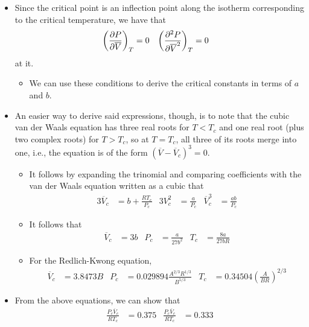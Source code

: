 \documentclass[../notes.tex]{subfiles}
\begin{document}
\begin{itemize}
\begin{itemize}
\begin{itemize}
        \end{itemize}
    \end{itemize}
    \item Since the critical point is an inflection point along the isotherm corresponding to the critical temperature, we have that
    \begin{align*}
        \left( \pdv{P}{\overline{V}} \right)_T &= 0&
        \left( \pdv[2]{P}{\overline{V}} \right)_T &= 0
    \end{align*}
    at it.
    \begin{itemize}
        \item We can use these conditions to derive the critical constants in terms of $a$ and $b$.
    \end{itemize}
    \item An easier way to derive said expressions, though, is to note that the cubic van der Waals equation has three real roots for $T<T_c$ and one real root (plus two complex roots) for $T>T_c$, so at $T=T_c$, all three of its roots merge into one, i.e., the equation is of the form $(\overline{V}-\overline{V}_c)^3=0$.
    \begin{itemize}
        \item It follows by expanding the trinomial and comparing coefficients with the van der Waals equation written as a cubic that
        \begin{align*}
            3\overline{V}_c &= b+\frac{RT_c}{P_c}&
            3V_c^2 &= \frac{a}{P_c}&
            \overline{V}_c^3 &= \frac{ab}{P_c}
        \end{align*}
        \item It follows that
        \begin{align*}
            \overline{V}_c &= 3b&
            P_c &= \frac{a}{27b^2}&
            T_c &= \frac{8a}{27bR}
        \end{align*}
        \item For the Redlich-Kwong equation,
        \begin{align*}
            \overline{V}_c &= 3.8473B&
            P_c &= 0.029894\frac{A^{2/3}R^{1/3}}{B^{5/3}}&
            T_c &= 0.34504\left( \frac{A}{BR} \right)^{2/3}
        \end{align*}
    \end{itemize}
    \item From the above equations, we can show that
    \begin{align*}
        \frac{P_c\overline{V}_c}{RT_c} &= 0.375&
        \frac{P_c\overline{V}_c}{RT_c} &= 0.333

\end{align*}
\end{itemize}
\end{document}
